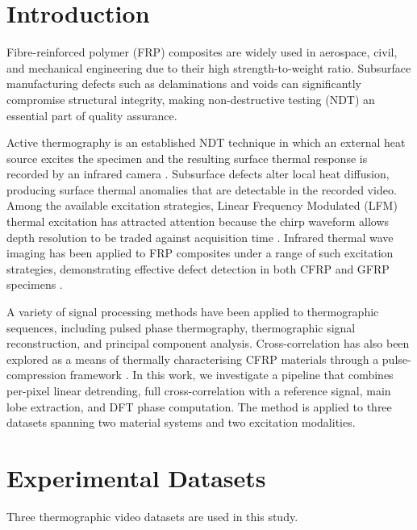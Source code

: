 \documentclass[conference]{IEEEtran}
\begin{document}
  \section{Introduction}

  Fibre-reinforced polymer (FRP) composites are widely used in aerospace,
  civil, and mechanical engineering due to their high strength-to-weight ratio.
  Subsurface manufacturing defects such as delaminations and voids can
  significantly compromise structural integrity, making non-destructive testing
  (NDT) an essential part of quality assurance.

  Active thermography is an established NDT technique in which an external heat
  source excites the specimen and the resulting surface thermal response is
  recorded by an infrared camera \cite{maldague2001}. Subsurface defects alter
  local heat diffusion, producing surface thermal anomalies that are detectable
  in the recorded video. Among the available excitation strategies, Linear
  Frequency Modulated (LFM) thermal excitation has attracted attention because
  the chirp waveform allows depth resolution to be traded against acquisition
  time \cite{mulaveesala2006}. Infrared thermal wave imaging has been applied
  to FRP composites under a range of such excitation strategies, demonstrating
  effective defect detection in both CFRP and GFRP specimens
  \cite{siddiqui2015,rani2020}.

  A variety of signal processing methods have been applied to thermographic
  sequences, including pulsed phase thermography, thermographic signal
  reconstruction, and principal component analysis. Cross-correlation has also
  been explored as a means of thermally characterising CFRP materials through
  a pulse-compression framework \cite{mulaveesala2011}. In this work, we
  investigate a pipeline that combines per-pixel linear detrending, full
  cross-correlation with a reference signal, main lobe extraction, and DFT
  phase computation. The method is applied to three datasets spanning two
  material systems and two excitation modalities.

  \section{Experimental Datasets}

  Three thermographic video datasets are used in this study.
\end{document}
